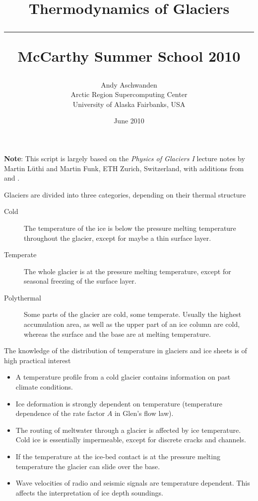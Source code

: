 \documentclass[11pt,a4paper,halfparskip]{scrartcl}
\begin{document}
\title{Thermodynamics of Glaciers\\[.5em]
\rule[1.em]{\textwidth}{2pt}
\Large{McCarthy Summer School 2010}}

\date{June 2010}

\author{
  \small Andy Aschwanden\\[-.5em] 
  \small Arctic Region Supercomputing Center\\[-.5em] 
  \small University of Alaska Fairbanks, USA}


\maketitle

{\bf Note}: This script is largely based on the \emph{Physics of Glaciers I} lecture notes by Martin L\"uthi and Martin Funk, ETH Zurich, Switzerland, with additions from \cite{GreveBlatter_disg} and \cite{Gusmeroli2010}.

\vspace{1em}

Glaciers are divided into three categories, depending on their thermal
structure
%
\begin{description}
\item[Cold] The temperature of the ice is below the pressure melting temperature
 throughout the glacier, except for maybe a thin surface layer.
\item[Temperate] The whole glacier is at the pressure melting temperature, except
 for seasonal freezing of the surface layer.
\item[Polythermal] Some parts of the glacier are cold, some temperate.
 Usually the highest accumulation area, as well as the upper part of an ice
 column are cold, whereas the surface and the base are at melting
 temperature.
\end{description}
%
The knowledge of the distribution of temperature in glaciers and ice sheets is
of high practical interest
%
\begin{itemize}\itemsep0ex
\item A temperature profile from a cold glacier contains information on past
 climate conditions.
\item Ice deformation is strongly dependent on temperature (temperature
 dependence of the rate factor $A$ in Glen's flow law).
\item The routing of meltwater through a glacier is affected by ice
 temperature.  Cold ice is essentially impermeable, except for discrete
 cracks and channels.
\item If the temperature at the ice-bed contact is at the pressure melting
 temperature the glacier can slide over the base.
\item Wave velocities of radio and seismic signals are temperature
 dependent. This affects the interpretation of ice depth soundings.
\end{itemize}
\end{document}
